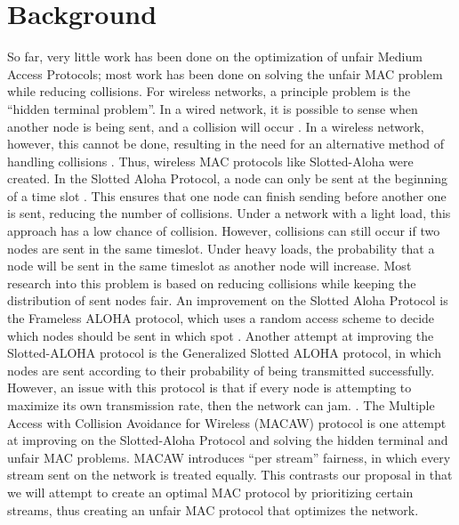 \documentclass{sigcomm-alternate}
\begin{document}
\section{Background}
{
So far, very little work has been done on the optimization of unfair Medium Access Protocols; most work has been done on solving the unfair MAC problem while reducing collisions. For wireless networks, a principle problem is the “hidden terminal problem”. In a wired network, it is possible to sense when another node is being sent, and a collision will occur \cite{869217}. In a wireless network, however, this cannot be done, resulting in the need for an alternative method of handling collisions \cite{6574961}. Thus, wireless MAC protocols like Slotted-Aloha were created.  In the Slotted Aloha Protocol, a node can only be sent at the beginning of a time slot \cite{5340799}. This ensures that one node can finish sending before another one is sent, reducing the number of collisions.  Under a network with a light load, this approach has a low chance of collision. However, collisions can still occur if two nodes are sent in the same timeslot. Under heavy loads, the probability that a node will be sent in the same timeslot as another node will increase. Most research into this problem is based on reducing collisions while keeping the distribution of sent nodes fair.  An improvement on the Slotted Aloha Protocol is the Frameless ALOHA protocol, which uses a random access scheme to decide which nodes should be sent in which spot \cite{6336861}. Another attempt at improving the Slotted-ALOHA protocol is the Generalized Slotted ALOHA protocol, in which nodes are sent according to their probability of being transmitted successfully. However, an issue with this protocol is that if every node is attempting to maximize its own transmission rate, then the network can jam. \cite{4548143 }.  The Multiple Access with Collision Avoidance for Wireless (MACAW) protocol is one attempt at improving on the Slotted-Aloha Protocol and solving the hidden terminal and unfair MAC problems. MACAW introduces “per stream” fairness, in which every stream sent on the network is treated equally. This contrasts our proposal in that we will attempt to create an optimal MAC protocol by prioritizing certain streams, thus creating an unfair MAC protocol that optimizes the network.


}
\end{document}
